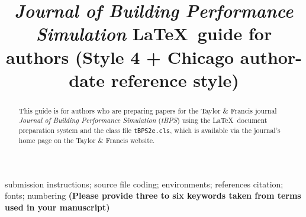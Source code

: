 \documentclass{tBPS2e}
\theoremstyle{plain}
\theoremstyle{definition}
\theoremstyle{remark}
\begin{document}


\title{\textit{Journal of Building Performance Simulation} \LaTeX\ guide for authors \break (Style 4 + Chicago author-date reference style)}

\author{
}

\maketitle

\begin{abstract}
This guide is for authors who are preparing papers for the Taylor \& Francis journal \textit{Journal of Building Performance Simulation}
(\textit{tBPS}) using the \LaTeX\ document preparation system and the class file \texttt{tBPS2e.cls}, which is available via the journal's home page on the Taylor \& Francis website.
\end{abstract}

\begin{keywords}
submission instructions; source file coding; environments; references citation; fonts; numbering
\bf{(Please provide three to six keywords taken from terms used in your manuscript)}
\end{keywords}
\end{document}
